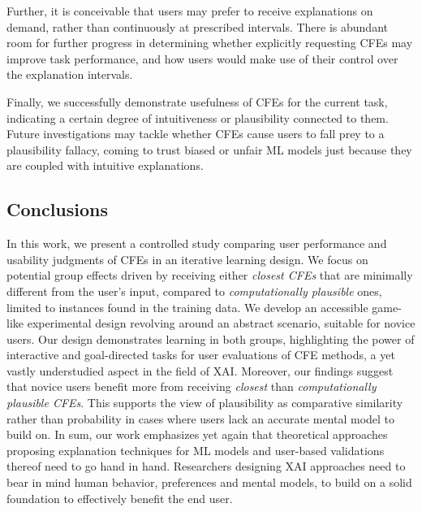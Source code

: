 Further, it is conceivable that users may prefer to receive explanations on demand, rather than continuously at prescribed intervals.
There is abundant room for further progress in determining whether explicitly requesting \glspl{CFE} may improve task performance, and how users would make use of their control over the explanation intervals.

Finally, we successfully demonstrate usefulness of \glspl{CFE} for the current task, indicating a certain degree of intuitiveness or plausibility connected to them. 
Future investigations may tackle whether \glspl{CFE} cause users to fall prey to a plausibility fallacy, coming to trust biased or unfair ML models just because they are coupled with intuitive explanations.

\subsection{Conclusions}\label{subsec:conclusion}
In this work, we present a controlled study comparing user performance and usability judgments of \glspl{CFE} in an iterative learning design.
We focus on potential group effects driven by receiving either \textit{closest \glspl{CFE}} that are minimally different from the user's input, compared to \textit{computationally plausible} ones, limited to instances found in the training data.
We develop an accessible game-like experimental design revolving around an abstract scenario, suitable for novice users.
Our design demonstrates learning in both groups, highlighting the power of interactive and goal-directed tasks for user evaluations of \gls{CFE} methods, a yet vastly understudied aspect in the field of \gls{XAI}.
Moreover, our findings suggest that novice users benefit more from receiving \textit{closest} than \textit{computationally plausible \glspl{CFE}}.
This supports the view of plausibility as comparative similarity rather than probability in cases where users lack an accurate mental model to build on.
In sum, our work emphasizes yet again that theoretical approaches proposing explanation techniques for \gls{ML} models and user-based validations thereof need to go hand in hand.
Researchers designing \gls{XAI} approaches need to bear in mind human behavior, preferences and mental models, to build on a solid foundation to effectively benefit the end user.

